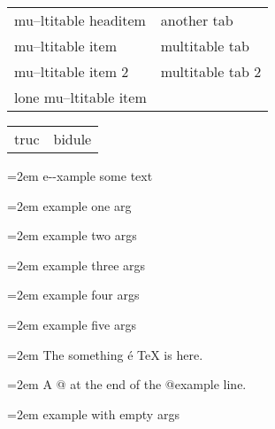 \documentclass{book}
\begin{document}
\begin{tabular}{m{} m{}}%
mu--ltitable headitem &another tab\\
mu--ltitable item &multitable tab\\
mu--ltitable item 2 &multitable tab 2
\index[cp]{index entry within multitable}%
\\
lone mu--ltitable item&\\
\end{tabular}%

\begin{tabular}{m{} m{}}%
truc &bidule\\
\end{tabular}%

\par\begingroup\obeylines\obeyspaces\frenchspacing\leftskip=2em\relax\parskip=0pt\relax\ttfamily{}%
e{-}{-}xample  some
   text
\endgroup{}%

\par\begingroup\obeylines\obeyspaces\frenchspacing\leftskip=2em\relax\parskip=0pt\relax\ttfamily{}%
example one arg
\endgroup{}%

\par\begingroup\obeylines\obeyspaces\frenchspacing\leftskip=2em\relax\parskip=0pt\relax\ttfamily{}%
example two args
\endgroup{}%

\par\begingroup\obeylines\obeyspaces\frenchspacing\leftskip=2em\relax\parskip=0pt\relax\ttfamily{}%
example three args
\endgroup{}%

\par\begingroup\obeylines\obeyspaces\frenchspacing\leftskip=2em\relax\parskip=0pt\relax\ttfamily{}%
example four args
\endgroup{}%

\par\begingroup\obeylines\obeyspaces\frenchspacing\leftskip=2em\relax\parskip=0pt\relax\ttfamily{}%
example five args
\endgroup{}%

\par\begingroup\obeylines\obeyspaces\frenchspacing\leftskip=2em\relax\parskip=0pt\relax\ttfamily{}%
The something \'{e} \TeX{} is here.
\endgroup{}%

\par\begingroup\obeylines\obeyspaces\frenchspacing\leftskip=2em\relax\parskip=0pt\relax\ttfamily{}%
A @ at the end of the @example line.
\endgroup{}%

\par\begingroup\obeylines\obeyspaces\frenchspacing\leftskip=2em\relax\parskip=0pt\relax\ttfamily{}%
example with empty args
\endgroup{}%
\end{document}
